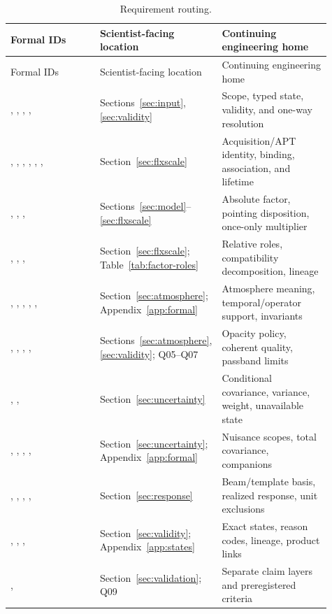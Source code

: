 \begin{longtable}{L{0.30\linewidth}L{0.26\linewidth}L{0.35\linewidth}}
\caption{Requirement routing.}\\
\toprule Formal IDs & Scientist-facing location & Continuing engineering home \\
\midrule\endfirsthead\toprule Formal IDs & Scientist-facing location & Continuing engineering home \\
\midrule\endhead
{}, , , ,  & Sections~\ref{sec:input}, \ref{sec:validity} & Scope, typed state, validity, and one-way resolution \\
, , , , , ,  & Section~\ref{sec:flxscale} & Acquisition/APT identity, binding, association, and lifetime \\
, , ,  & Sections~\ref{sec:model}--\ref{sec:flxscale} & Absolute factor, pointing disposition, once-only multiplier \\
, , ,  & Section~\ref{sec:flxscale}; Table~\ref{tab:factor-roles} & Relative roles, compatibility decomposition, lineage \\
, , , , ,  & Section~\ref{sec:atmosphere}; Appendix~\ref{app:formal} & Atmosphere meaning, temporal/operator support, invariants \\
, , , ,  & Sections~\ref{sec:atmosphere}, \ref{sec:validity}; Q05--Q07 & Opacity policy, coherent quality, passband limits \\
, ,  & Section~\ref{sec:uncertainty} & Conditional covariance, variance, weight, unavailable state \\
, , , ,  & Section~\ref{sec:uncertainty}; Appendix~\ref{app:formal} & Nuisance scopes, total covariance, companions \\
, , , ,  & Section~\ref{sec:response} & Beam/template basis, realized response, unit exclusions \\
, , ,  & Section~\ref{sec:validity}; Appendix~\ref{app:states} & Exact states, reason codes, lineage, product links \\
,  & Section~\ref{sec:validation}; Q09 & Separate claim layers and preregistered criteria \\
\bottomrule
\end{longtable}

